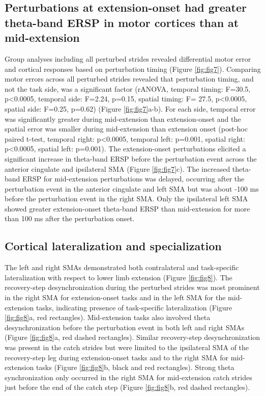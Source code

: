 \documentclass[../thesis_seyed.tex]{subfiles}
\begin{document}
\subsection{Perturbations at extension-onset had greater theta-band ERSP in motor cortices than at mid-extension}
Group analyses including all perturbed strides revealed differential motor error and cortical responses based on perturbation timing (Figure \ref{fig:fig7}). Comparing motor errors across all perturbed strides revealed that perturbation timing, and not the task side, was a significant factor (rANOVA, temporal timing: F=30.5, p<0.0005, temporal side: F=2.24, p=0.15, spatial timing: F= 27.5, p<0.0005, spatial side: F=0.25, p=0.62) (Figure \ref{fig:fig7}a-b). For each side, temporal error was significantly greater during mid-extension than extension-onset and the spatial error was smaller during mid-extension than extension onset (post-hoc paired t-test, temporal right: p<0.0005, temporal left: p=0.001, spatial right: p<0.0005, spatial left: p=0.001). The extension-onset perturbations elicited a significant increase in theta-band ERSP before the perturbation event across the anterior cingulate {and ipsilateral} SMA (Figure \ref{fig:fig7}c). The increased theta-band ERSP for mid-extension perturbations was delayed, occurring after the perturbation event in the anterior cingulate and left SMA but was about -100 ms before the perturbation event in the right SMA. {Only the ipsilateral left SMA showed greater extension-onset theta-band ERSP than mid-extension for more than 100 ms after the perturbation onset.}

\subsection{Cortical lateralization and specialization}
The left and right SMAs demonstrated both contralateral and task-specific lateralization with respect to lower limb extension (Figure \ref{fig:fig8}). The recovery-step desynchronization during the perturbed strides was most prominent in the right SMA for extension-onset tasks and in the left SMA for the mid-extension tasks, indicating presence of task-specific lateralization (Figure \ref{fig:fig8}a, red rectangles). Mid-extension tasks also involved theta desynchronization before the perturbation event in both left and right SMAs (Figure \ref{fig:fig8}a, red dashed rectangles). Similar recovery-step desynchronization was present in the catch strides but were limited to the ipsilateral SMA of the recovery-step leg during extension-onset tasks and to the right SMA for mid-extension tasks (Figure \ref{fig:fig8}b, black and red rectangles). Strong theta synchronization only occurred in the right SMA for mid-extension catch strides just before the end of the catch step (Figure \ref{fig:fig8}b, red dashed rectangles).
\end{document}
